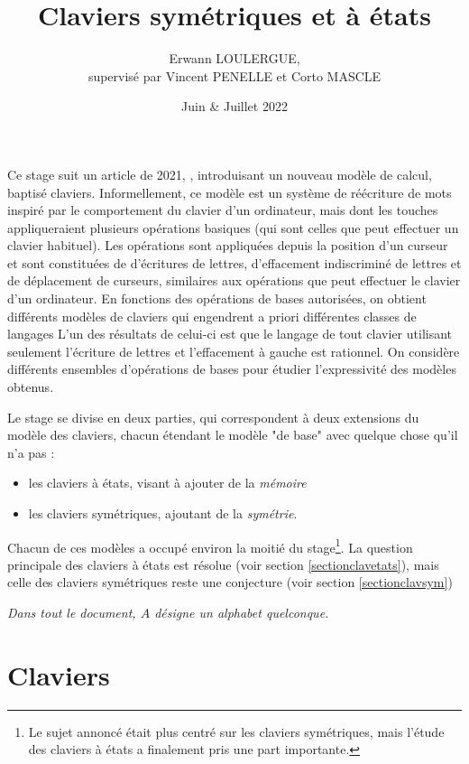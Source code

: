 \documentclass[12pt, a4paper]{article}
\title{Claviers symétriques et à états}
\author{Erwann LOULERGUE, \\ supervisé par Vincent PENELLE et Corto MASCLE}
\date{Juin \& Juillet 2022}
\begin{document}
    \maketitle
    Ce stage suit un article de 2021, \cite{bible}, introduisant un nouveau modèle de calcul,
    baptisé claviers.
    Informellement, ce modèle est un système de réécriture de mots inspiré par le comportement du clavier d’un ordinateur, mais dont les touches appliqueraient plusieurs opérations basiques (qui sont celles que peut effectuer un clavier habituel). Les opérations sont appliquées depuis la position d’un curseur et sont constituées de d’écritures de lettres, d’effacement indiscriminé de lettres et de déplacement de curseurs, similaires aux opérations que peut effectuer le clavier d’un ordinateur. En fonctions des opérations de bases autorisées, on obtient différents modèles de claviers qui engendrent a priori différentes classes de langages
    L’un des résultats de celui-ci est que le langage de tout clavier
    utilisant seulement l’écriture de lettres et l’effacement à gauche est rationnel. 
    On considère différents ensembles d’opérations de bases pour étudier l’expressivité des modèles obtenus.
    
    Le stage se divise en deux parties, qui correspondent à deux extensions du modèle des claviers, chacun étendant le modèle "de base" avec quelque chose qu'il n'a pas :
    \begin{itemize}
        \item les claviers à états, visant à ajouter de la  \emph{mémoire}
        \item les claviers symétriques, ajoutant de la \emph{symétrie}.
    \end{itemize}
    
    Chacun de ces modèles a occupé environ la moitié du stage\footnote{Le sujet annoncé était plus centré sur les claviers symétriques, mais l'étude des claviers à états a finalement pris une part importante.}. 
    La question principale des claviers à états est résolue (voir section \ref{sectionclavetats}), mais celle des claviers symétriques reste une conjecture (voir section \ref{sectionclavsym})
    \clearpage    
    
    
    \emph{Dans tout le document, $A$ désigne un alphabet quelconque.}
    \section{Claviers}
\end{document}
